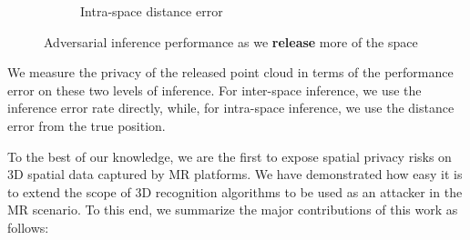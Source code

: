 \begin{figure}[t]
\begin{subfigure}{0.37\columnwidth}
		\vspace{-5mm}
        \caption{\small Intra-space distance error}
		\label{fig:partial-intraspace}
	\end{subfigure}
	\vspace{-3mm}
    \caption{\small Adversarial inference performance as we \textbf{release} more of the space}
	\label{fig:partial-performance}
	\vspace{-3mm}
\end{figure}

We measure the privacy of the released point cloud in terms of the performance error on these two levels of inference. For inter-space inference, we use the inference error rate directly, while, for intra-space inference, we use the distance error from the true position.

To the best of our knowledge, we are the first to expose spatial privacy risks on 3D spatial data captured by MR platforms. We have demonstrated how easy it is to extend the scope of 3D recognition algorithms to be used as an attacker in the MR scenario. To this end, we summarize the major contributions of this work as follows:

